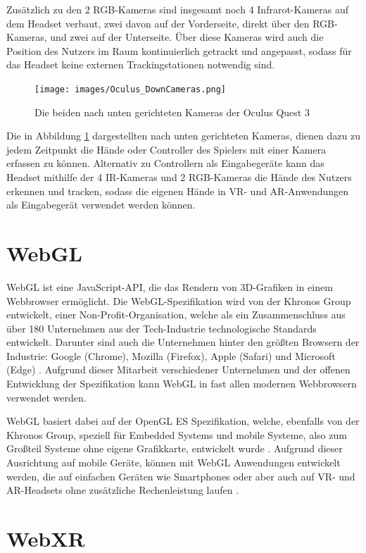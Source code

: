 Zusätzlich zu den 2 RGB-Kameras sind insgesamt noch 4 Infrarot-Kameras auf dem Headset verbaut, zwei davon auf der Vorderseite, direkt über den RGB-Kameras, und zwei auf der Unterseite.
Über diese Kameras wird auch die Position des Nutzers im Raum kontinuierlich getrackt und angepasst, sodass für das Headset keine externen Trackingstationen notwendig sind.
\begin{figure}[H]
  \centering
  \texttt{[image: images/Oculus\_DownCameras.png]}
  \caption{Die beiden nach unten gerichteten Kameras der Oculus Quest 3}
  \label{fig:quest-hand-cameras}
\end{figure}
Die in Abbildung \ref{fig:quest-hand-cameras} dargestellten nach unten gerichteten Kameras, dienen dazu zu jedem Zeitpunkt die Hände oder Controller des Spielers mit einer Kamera erfassen zu können.
Alternativ zu Controllern als Eingabegeräte kann das Headset mithilfe der 4 IR-Kameras und 2 RGB-Kameras die Hände des Nutzers erkennen und tracken, sodass die eigenen Hände in VR- und AR-Anwendungen als Eingabegerät verwendet werden können.
\autocite[]{meta-quest-3}


\section{WebGL}

WebGL ist eine JavaScript-API, die das Rendern von 3D-Grafiken in einem Webbrowser ermöglicht.
Die WebGL-Spezifikation wird von der Khronos Group entwickelt, einer Non-Profit-Organisation, welche als ein Zusammenschluss aus über 180 Unternehmen aus der Tech-Industrie technologische Standards entwickelt.
Darunter sind auch die Unternehmen hinter den größten Browsern der Industrie: Google (Chrome), Mozilla (Firefox), Apple (Safari) und Microsoft (Edge) \autocite[]{khronos-webgl, khronos-about}.
Aufgrund dieser Mitarbeit verschiedener Unternehmen und der offenen Entwicklung der Spezifikation kann WebGL in fast allen modernen Webbrowsern verwendet werden.

WebGL basiert dabei auf der OpenGL ES Spezifikation, welche, ebenfalls von der Khronos Group, speziell für Embedded Systems und mobile Systeme, also zum Großteil Systeme ohne eigene Grafikkarte, entwickelt wurde \autocite[]{khronos-opengles}.
Aufgrund dieser Ausrichtung auf mobile Geräte, können mit WebGL Anwendungen entwickelt werden, die auf einfachen Geräten wie Smartphones oder aber auch auf VR- und AR-Headsets ohne zusätzliche Rechenleistung laufen \autocite[][S.3]{Baruah2021}.


\section{WebXR}

